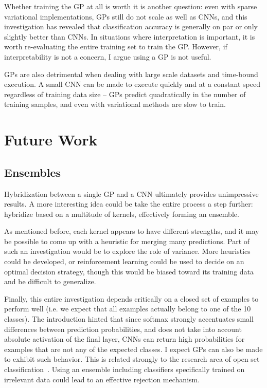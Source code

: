 \documentclass{article}
\begin{document}
Whether training the GP at all is worth it is another question: even with sparse variational implementations, GPs still do not scale as well as CNNs, and this investigation has revealed that classification accuracy is generally on par or only slightly better than CNNs. In situations where interpretation is important, it is worth re-evaluating the entire training set to train the GP. However, if interpretability is not a concern, I argue using a GP is not useful. 

GPs are also detrimental when dealing with large scale datasets and time-bound execution. A small CNN can be made to execute quickly and at a constant speed regardless of training data size -- GPs predict quadratically in the number of training samples, and even with variational methods are slow to train.

\section{Future Work}

\subsection{Ensembles}
Hybridization between a single GP and a CNN ultimately provides unimpressive results. A more interesting idea could be take the entire process a step further: hybridize based on a multitude of kernels, effectively forming an ensemble. 

As mentioned before, each kernel appears to have different strengths, and it may be possible to come up with a heuristic for merging many predictions. Part of such an investigation would be to explore the role of variance. More heuristics could be developed, or reinforcement learning could be used to decide on an optimal decision strategy, though this would be biased toward its training data and be difficult to generalize.

Finally, this entire investigation depends critically on a closed set of examples to perform well (i.e. we expect that all examples actually belong to one of the 10 classes). The introduction hinted that since softmax strongly accentuates small differences between prediction probabilities, and does not take into account absolute activation of the final layer, CNNs can return high probabilities for examples that are not any of the expected classes. I expect GPs can also be made to exhibit such behavior. This is related strongly to the research area of open set classification~\cite{scheirer2013toward}. Using an ensemble including classifiers specifically trained on irrelevant data could lead to an effective rejection mechanism.
\end{document}
